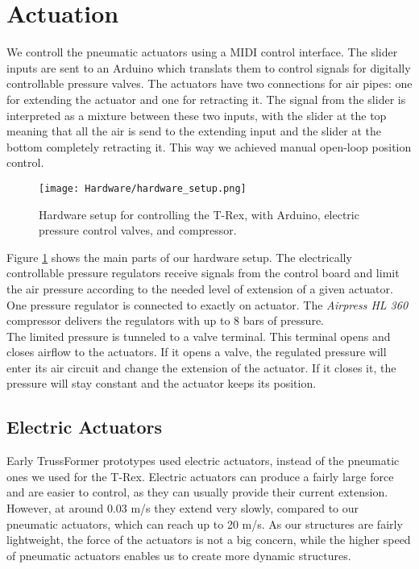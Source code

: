 \section{Actuation}
We controll the pneumatic actuators using a MIDI control interface. The slider inputs are sent to an Arduino which translats them to control signals for digitally controllable pressure valves. The actuators have two connections for air pipes: one for extending the actuator and one for retracting it. The signal from the slider is interpreted as a mixture between these two inputs, with the slider at the top meaning that all the air is send to the extending input and the slider at the bottom completely retracting it. This way we achieved manual open-loop position control.\\
\begin{figure}[h!]
    \texttt{[image: Hardware/hardware\_setup.png]}
    \centering
    \caption{Hardware setup for controlling the T-Rex, with Arduino, electric pressure control valves, and compressor.}
    \label{fig:hardware_setup}
\end{figure}
Figure \ref{fig:hardware_setup} shows the main parts of our hardware setup. The electrically controllable pressure regulators receive signals from the control board and limit the air pressure according to the needed level of extension of a given actuator. One pressure regulator is connected to exactly on actuator. The \textit{Airpress HL 360} compressor delivers the regulators with up to 8 bars of pressure.\\
The limited pressure is tunneled to a valve terminal. This terminal opens and closes airflow to the actuators. If it opens a valve, the regulated pressure will enter its air circuit and change the extension of the actuator. If it closes it, the pressure will stay constant and the actuator keeps its position.

\subsection{Electric Actuators}
Early TrussFormer prototypes used electric actuators, instead of the pneumatic ones we used for the T-Rex. Electric actuators can produce a fairly large force and are easier to control, as they can usually provide their current extension. However, at around 0.03 m/s they extend very slowly, compared to our pneumatic actuators, which can reach up to 20 m/s. As our structures are fairly lightweight, the force of the actuators is not a big concern, while the higher speed of pneumatic actuators enables us to create more dynamic structures.

